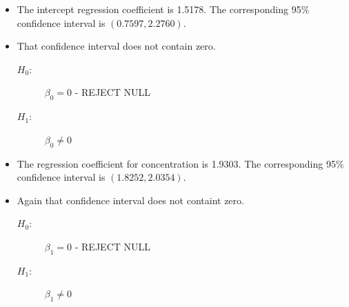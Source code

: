 \documentclass[a4paper,12pt]{article}
\begin{document}
\begin{itemize}
\item The intercept regression coefficient is 1.5178. The corresponding 95\% confidence interval is $(0.7597, 2.2760)$.
\item That confidence interval does not contain zero.
		\begin{description}
			\item[ $H_0$:] $\beta_0= 0 $ - REJECT NULL
			\item[ $H_1$:] $\beta_0 \neq 0$
		\end{description}
	\item The regression coefficient  for concentration is 1.9303. The corresponding 95\% confidence interval is $(1.8252,2.0354)$.
	\item Again that confidence interval does not containt zero.
	\begin{description}
		\item[ $H_0$:] $\beta_1= 0 $ - REJECT NULL
		\item[ $H_1$:] $\beta_1 \neq 0$
	\end{description}
\end{itemize}
\newpage
\end{document}
